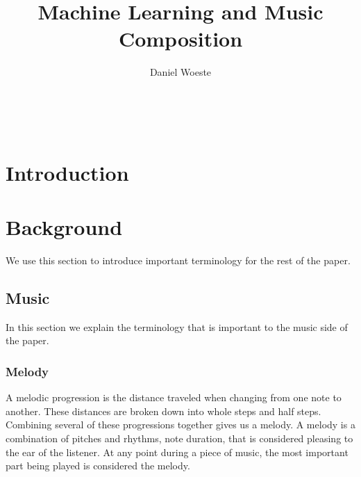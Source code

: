 \documentclass{sig-alternate}
\begin{document}

\title{Machine Learning and Music Composition}
\author{
\alignauthor
Daniel Woeste\\
	\\
	\\
	\\
}


\maketitle
\begin{abstract}

\end{abstract}


\section{Introduction}
\label{sec:introduction}

\section{Background}
\label{sec:background}
	We use this section to introduce important terminology for the rest of the paper.

\subsection{Music}
\label{sec:music}
	In this section we explain the terminology that is important to the music side of the paper.
\subsubsection{Melody}
\label{sec:melody}
A melodic progression is the distance traveled when changing from one note to another. These distances are broken down into whole steps and half steps. Combining several of these progressions together gives us a melody. A melody is a combination of pitches and rhythms, note duration, that is considered pleasing to the ear of the listener. At any point during a piece of music, the most important part being played is considered the melody. 
\end{document}
